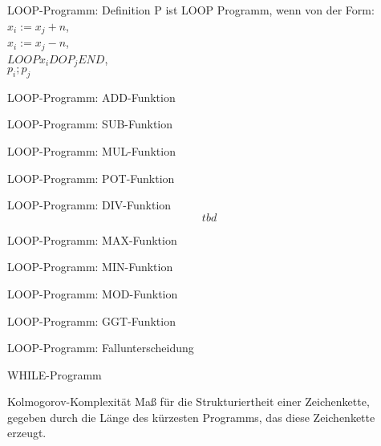 \documentclass[a7paper,print,grid=both]{kartei}
\begin{document}
\begin{karte}{LOOP-Programm: Definition}
P ist LOOP Programm, wenn von der Form:\\$x_i:=x_j+n$,\\$x_i:=x_j-n$,\\$LOOP x_i DO P_j END$,\\$p_i;p_j$
\end{karte}
\begin{karte}{LOOP-Programm: ADD-Funktion}

\end{karte}
\begin{karte}{LOOP-Programm: SUB-Funktion}

\end{karte}
\begin{karte}{LOOP-Programm: MUL-Funktion}

\end{karte}
\begin{karte}{LOOP-Programm: POT-Funktion}

\end{karte}
\begin{karte}{LOOP-Programm: DIV-Funktion}
\[tbd\]
\end{karte}
\begin{karte}{LOOP-Programm: MAX-Funktion}

\end{karte}
\begin{karte}{LOOP-Programm: MIN-Funktion}

\end{karte}
\begin{karte}{LOOP-Programm: MOD-Funktion}

\end{karte}
\begin{karte}{LOOP-Programm: GGT-Funktion}

\end{karte}
\begin{karte}{LOOP-Programm: Fallunterscheidung}

\end{karte}
\begin{karte}{WHILE-Programm}

\end{karte}
\begin{karte}{Kolmogorov-Komplexität}
Maß für die Strukturiertheit einer Zeichenkette, gegeben durch die Länge des kürzesten Programms, das diese Zeichenkette erzeugt.
\end{karte}
\end{document}
